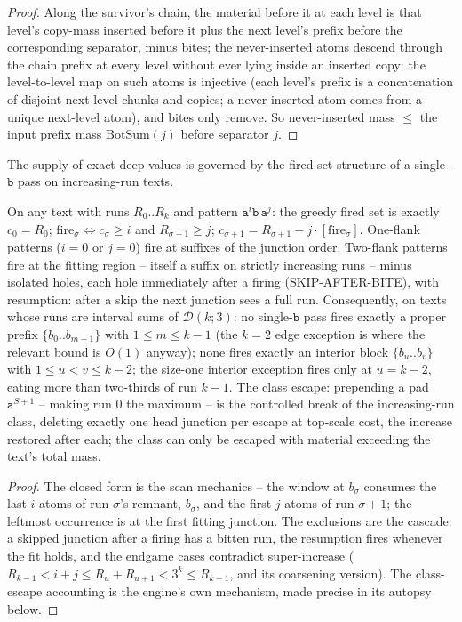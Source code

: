 \documentclass[runningheads,envcountsect]{llncs}
\begin{document}
\begin{proof}
    Along the survivor's chain, the material before it at each level is that level's copy-mass inserted before it plus the next level's prefix before the corresponding separator, minus bites; the never-inserted atoms descend through the chain prefix at every level without ever lying inside an inserted copy: the level-to-level map on such atoms is injective (each level's prefix is a concatenation of disjoint next-level chunks and copies; a never-inserted atom comes from a unique next-level atom), and bites only remove. So never-inserted mass $\le$ the input prefix mass $\mathrm{BotSum}(j)$ before separator $j$.
\end{proof}

\noindent The supply of exact deep values is governed by the fired-set structure of a single-$\mathtt b$ pass on increasing-run texts.

\begin{lemma}
    \label{dich:lem:FSL}
    On any text with runs $R_0..R_k$ and pattern $\mathtt a^{i}\mathtt b\,\mathtt a^{j}$: the greedy fired set is exactly $c_0 = R_0$; $\mathrm{fire}_{\sigma} \iff c_{\sigma} \ge i$ and $R_{\sigma+1} \ge j$; $c_{\sigma+1} = R_{\sigma+1} - j \cdot [\mathrm{fire}_{\sigma}]$. One-flank patterns ($i = 0$ or $j = 0$) fire at suffixes of the junction order. Two-flank patterns fire at the fitting region -- itself a suffix on strictly increasing runs -- minus isolated holes, each hole immediately after a firing (SKIP-AFTER-BITE), with resumption: after a skip the next junction sees a full run. Consequently, on texts whose runs are interval sums of $\mathcal D(k;3)$: no single-$\mathtt b$ pass fires exactly a proper prefix $\{b_0..b_{m-1}\}$ with $1 \le m \le k{-}1$ (the $k = 2$ edge exception is where the relevant bound is $O(1)$ anyway); none fires exactly an interior block $\{b_u..b_v\}$ with $1 \le u < v \le k{-}2$; the size-one interior exception fires only at $u = k{-}2$, eating more than two-thirds of run $k{-}1$. The class escape: prepending a pad $\mathtt a^{S+1}$ -- making run $0$ the maximum -- is the controlled break of the increasing-run class, deleting exactly one head junction per escape at top-scale cost, the increase restored after each; the class can only be escaped with material exceeding the text's total mass.
\end{lemma}

\begin{proof}
    The closed form is the scan mechanics -- the window at $b_{\sigma}$ consumes the last $i$ atoms of run $\sigma$'s remnant, $b_{\sigma}$, and the first $j$ atoms of run $\sigma{+}1$; the leftmost occurrence is at the first fitting junction. The exclusions are the cascade: a skipped junction after a firing has a bitten run, the resumption fires whenever the fit holds, and the endgame cases contradict super-increase ($R_{k-1} < i + j \le R_u + R_{u+1} < 3^{k} \le R_{k-1}$, and its coarsening version). The class-escape accounting is the engine's own mechanism, made precise in its autopsy below.
\end{proof}
\end{document}
